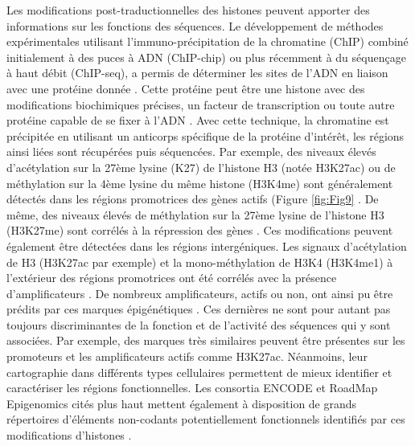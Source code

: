Les modifications post-traductionnelles des histones peuvent apporter des informations sur les fonctions des séquences. Le développement de méthodes expérimentales utilisant l’immuno-précipitation de la chromatine (ChIP) combiné initialement à des puces à ADN (ChIP-chip) ou plus récemment à du séquençage à haut débit (\acrshort{ChIP-seq}), a permis de déterminer les sites de l’ADN en liaison avec une protéine donnée \citep{ren_genome-wide_2000, barski_high-resolution_2007}. Cette protéine peut être une histone avec des modifications biochimiques précises, un facteur de transcription ou toute autre protéine capable de se fixer à l’ADN \citep{visel_chip-seq_2009}. Avec cette technique, la chromatine est précipitée en utilisant un anticorps spécifique de la protéine d’intérêt, les régions ainsi liées sont récupérées puis séquencées. Par exemple, des niveaux élevés d'acétylation sur la 27ème lysine (K27) de l’histone H3 (notée H3K27ac) ou de méthylation sur la 4ème lysine du même histone (H3K4me) sont généralement détectés dans les régions promotrices des gènes actifs (Figure \ref{fig:Fig9} \citep{bernstein_genomic_2005}. De même, des niveaux élevés de méthylation sur la 27ème lysine de l’histone H3 (H3K27me) sont corrélés à la répression des gènes \citep{lee_control_2006}. Ces modifications peuvent également être détectées dans les régions intergéniques. Les signaux d'acétylation de H3 (H3K27ac par exemple) et la mono-méthylation de H3K4 (H3K4me1) à l'extérieur des régions promotrices ont été corrélés avec la présence d’\glspl{amplificateur} \citep{heintzman_distinct_2007}. De nombreux \glspl{amplificateur}, actifs ou non, ont ainsi pu être prédits par ces marques épigénétiques \citep{creyghton_histone_2010}. Ces dernières ne sont pour autant pas toujours discriminantes de la fonction et de l’activité des séquences qui y sont associées. Par exemple, des marques très similaires peuvent être présentes sur les promoteurs et les \glspl{amplificateur} actifs comme H3K27ac. Néanmoins, leur cartographie dans différents types cellulaires permettent de mieux identifier et caractériser les régions fonctionnelles. Les consortia ENCODE et RoadMap Epigenomics cités plus haut mettent également à disposition de grands répertoires d’éléments non-codants potentiellement fonctionnels identifiés par ces modifications d’histones \citep{davis_encyclopedia_2018, roadmap_epigenomics_consortium_integrative_2015}.

